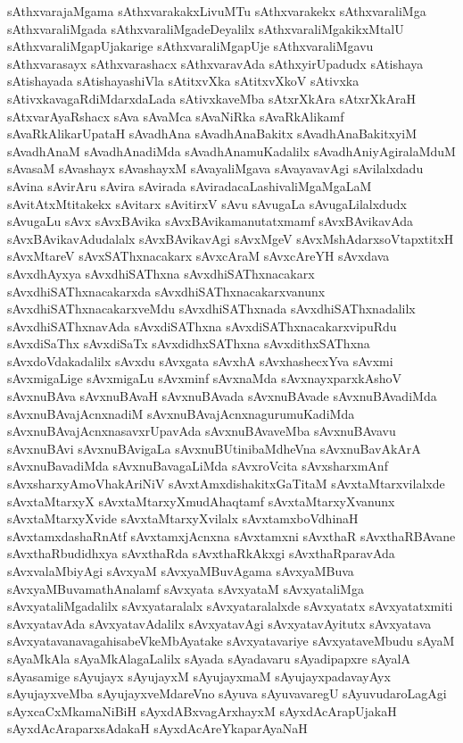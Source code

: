 {sAthxvarajaMgama
sAthxvarakakxLivuMTu
sAthxvarakekx
sAthxvaraliMga
sAthxvaraliMgada
sAthxvaraliMgadeDeyalilx
sAthxvaraliMgakikxMtalU
sAthxvaraliMgapUjakarige
sAthxvaraliMgapUje
sAthxvaraliMgavu
sAthxvarasayx
sAthxvarashacx
sAthxvaravAda
sAthxyirUpadudx
sAtishaya
sAtishayada
sAtishayashiVla
sAtitxvXka
sAtitxvXkoV
sAtivxka
sAtivxkavagaRdiMdarxdaLada
sAtivxkaveMba
sAtxrXkAra
sAtxrXkAraH
sAtxvarAyaRshacx
sAva
sAvaMca
sAvaNiRka
sAvaRkAlikamf
sAvaRkAlikarUpataH
sAvadhAna
sAvadhAnaBakitx
sAvadhAnaBakitxyiM
sAvadhAnaM
sAvadhAnadiMda
sAvadhAnamuKadalilx
sAvadhAniyAgiralaMduM
sAvasaM
sAvashayx
sAvashayxM
sAvayaliMgava
sAvayavavAgi
sAvilalxdadu
sAvina
sAvirAru
sAvira
sAvirada
sAviradacaLashivaliMgaMgaLaM
sAvitAtxMtitakekx
sAvitarx
sAvitirxV
sAvu
sAvugaLa
sAvugaLilalxdudx
sAvugaLu
sAvx
sAvxBAvika
sAvxBAvikamanutatxmamf
sAvxBAvikavAda
sAvxBAvikavAdudalalx
sAvxBAvikavAgi
sAvxMgeV
sAvxMshAdarxsoVtapxtitxH
sAvxMtareV
sAvxSAThxnacakarx
sAvxcAraM
sAvxcAreYH
sAvxdava
sAvxdhAyxya
sAvxdhiSAThxna
sAvxdhiSAThxnacakarx
sAvxdhiSAThxnacakarxda
sAvxdhiSAThxnacakarxvanunx
sAvxdhiSAThxnacakarxveMdu
sAvxdhiSAThxnada
sAvxdhiSAThxnadalilx
sAvxdhiSAThxnavAda
sAvxdiSAThxna
sAvxdiSAThxnacakarxvipuRdu
sAvxdiSaThx
sAvxdiSaTx
sAvxdidhxSAThxna
sAvxdithxSAThxna
sAvxdoVdakadalilx
sAvxdu
sAvxgata
sAvxhA
sAvxhashecxYva
sAvxmi
sAvxmigaLige
sAvxmigaLu
sAvxminf
sAvxnaMda
sAvxnayxparxkAshoV
sAvxnuBAva
sAvxnuBAvaH
sAvxnuBAvada
sAvxnuBAvade
sAvxnuBAvadiMda
sAvxnuBAvajAcnxnadiM
sAvxnuBAvajAcnxnagurumuKadiMda
sAvxnuBAvajAcnxnasavxrUpavAda
sAvxnuBAvaveMba
sAvxnuBAvavu
sAvxnuBAvi
sAvxnuBAvigaLa
sAvxnuBUtinibaMdheVna
sAvxnuBavAkArA
sAvxnuBavadiMda
sAvxnuBavagaLiMda
sAvxroVcita
sAvxsharxmAnf
sAvxsharxyAmoVhakAriNiV
sAvxtAmxdishakitxGaTitaM
sAvxtaMtarxvilalxde
sAvxtaMtarxyX
sAvxtaMtarxyXmudAhaqtamf
sAvxtaMtarxyXvanunx
sAvxtaMtarxyXvide
sAvxtaMtarxyXvilalx
sAvxtamxboVdhinaH
sAvxtamxdashaRnAtf
sAvxtamxjAcnxna
sAvxtamxni
sAvxthaR
sAvxthaRBAvane
sAvxthaRbudidhxya
sAvxthaRda
sAvxthaRkAkxgi
sAvxthaRparavAda
sAvxvalaMbiyAgi
sAvxyaM
sAvxyaMBuvAgama
sAvxyaMBuva
sAvxyaMBuvamathAnalamf
sAvxyata
sAvxyataM
sAvxyataliMga
sAvxyataliMgadalilx
sAvxyataralalx
sAvxyataralalxde
sAvxyatatx
sAvxyatatxmiti
sAvxyatavAda
sAvxyatavAdalilx
sAvxyatavAgi
sAvxyatavAyitutx
sAvxyatava
sAvxyatavanavagahisabeVkeMbAyatake
sAvxyatavariye
sAvxyataveMbudu
sAyaM
sAyaMkAla
sAyaMkAlagaLalilx
sAyada
sAyadavaru
sAyadipapxre
sAyalA
sAyasamige
sAyujayx
sAyujayxM
sAyujayxmaM
sAyujayxpadavayAyx
sAyujayxveMba
sAyujayxveMdareVno
sAyuva
sAyuvavaregU
sAyuvudaroLagAgi
sAyxcaCxMkamaNiBiH
sAyxdABxvagArxhayxM
sAyxdAcArapUjakaH
sAyxdAcAraparxsAdakaH
sAyxdAcAreYkaparAyaNaH
}
